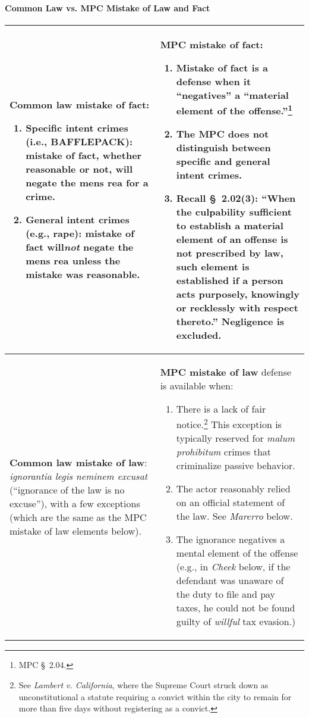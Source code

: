 \paragraph{Common Law vs. MPC Mistake of Law and Fact}

\begin{tabular}{ | p{5.5cm} | p{5.5cm} |}
\hline
    \textbf{Common law mistake of fact:}
    \begin{enumerate}
        \item Specific intent crimes (i.e., BAFFLEPACK): mistake of fact, 
        whether reasonable or not, will negate the mens rea for a crime.
        \item General intent crimes (e.g., rape): mistake of fact 
        will\emph{not} negate the mens rea unless the mistake was reasonable.
    \end{enumerate} &
    \textbf{MPC mistake of fact:}
    \begin{enumerate}
        \item Mistake of fact is a defense when it ``negatives'' a ``material 
        element of the offense.''\footnote{MPC \S\ 2.04.}
        \item The MPC does not distinguish between specific and general intent 
        crimes.
        \item Recall \S\ 2.02(3): ``When the culpability sufficient to 
        establish a material element of an offense is not prescribed by law, 
        such element is established if a person acts purposely, knowingly or 
        recklessly with respect thereto.'' Negligence is excluded.
    \end{enumerate} \\ \hline
    \textbf{Common law mistake of law}: \emph{ignorantia legis neminem 
    excusat} (``ignorance of the law is no excuse''), with a 
    few exceptions (which are the same as the MPC mistake of law elements 
    below). &
    \textbf{MPC mistake of law} defense is available when:
    \begin{enumerate}
        \item There is a lack of fair notice.\footnote{See \emph{Lambert v. 
        California}, where the Supreme Court struck down as unconstitutional a 
        statute requiring a convict within the city to remain for more than 
        five days without registering as a convict.} This exception is 
        typically reserved for \emph{malum prohibitum} crimes that criminalize 
        passive behavior.
        \item The actor reasonably relied on an official statement of the law. 
        See \emph{Marerro} below.
        \item The ignorance negatives a mental element of the offense (e.g.,  
        in \emph{Cheek} below, if the defendant was unaware of the duty to 
        file and pay taxes, he could not be found guilty of \emph{willful} tax 
        evasion.)
    \end{enumerate} \\
\hline
\end{tabular}

